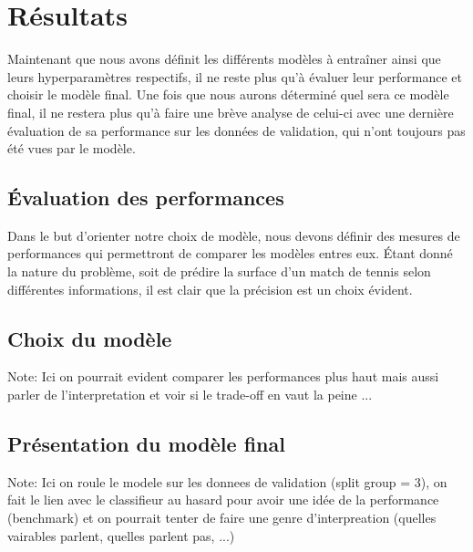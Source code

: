 \section{Résultats}
Maintenant que nous avons définit les différents modèles à entraîner ainsi que leurs hyperparamètres respectifs, il ne reste plus qu'à évaluer leur performance et choisir le modèle final. Une fois que nous aurons déterminé quel sera ce modèle final, il ne restera plus qu'à faire une brève analyse de celui-ci avec une dernière évaluation de sa performance sur les données de validation, qui n'ont toujours pas été vues par le modèle.  

\subsection{Évaluation des performances}
Dans le but d'orienter notre choix de modèle, nous devons définir des mesures de performances qui permettront de comparer les modèles entres eux. Étant donné la nature du problème, soit de prédire la surface d'un match de tennis selon différentes informations, il est clair que la précision est un choix évident. 

\subsection{Choix du modèle}
Note: Ici on pourrait evident comparer les performances plus haut mais aussi parler de l'interpretation et voir si le trade-off en vaut la peine ...

\subsection{Présentation du modèle final}
Note: Ici on roule le modele sur les donnees de validation (split group = 3), on fait le lien avec le classifieur au hasard pour avoir une idée de la performance (benchmark) et on pourrait tenter de faire une genre d'interpreation (quelles vairables parlent, quelles parlent pas, ...)
